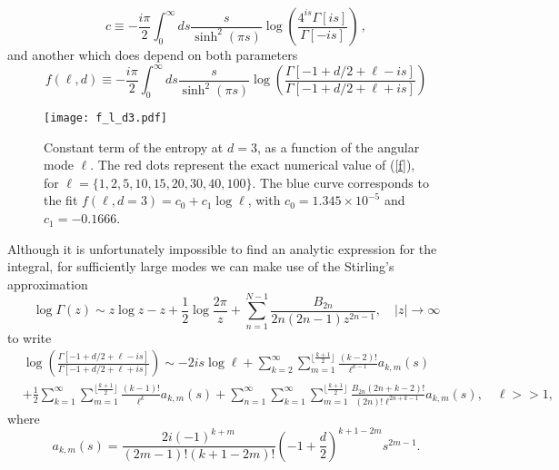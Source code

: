 \documentclass[12pt,a4paper]{article}
\begin{document}
\begin{equation}
c\equiv-\frac{i \pi}{2}\int_0^{\infty} ds \frac{s}{\sinh^2(\pi s)}\log{\left(\frac{4^{ i s}\Gamma\left[i s\right]}{\Gamma\left[-i s\right]}\right)}\, ,
\end{equation}
and another which does depend on both parameters
\begin{equation}\label{f}
f(\ell,d)\equiv-\frac{i \pi}{2}\int_0^{\infty} ds \frac{s}{\sinh^2(\pi s)}\log{\left(\frac{\Gamma\left[-1+d/2+\ell-i s\right]}{\Gamma\left[-1+d/2+\ell+i s\right]}\right)}
\end{equation}
\begin{figure}[t]
\begin{center}  
\texttt{[image: f\_l\_d3.pdf]}
\caption{Constant term of the entropy at $d=3$, as a function of the angular mode $\ell$. The red dots represent the exact numerical value of (\ref{f}), for $\ell=\lbrace 1, 2,5, 10, 15, 20, 30, 40, 100 \rbrace$. The blue curve corresponds to the fit $f(\ell,d=3)=c_0+ c_1\log{\ell}$, with $c_0=1.345\times 10^{-5}$ and $c_1=-0.1666$.}
\label{f_l_d3}
\end{center}  
\end{figure}
Although it is unfortunately impossible to find an analytic expression for the integral, for sufficiently large modes we can make use of the Stirling's approximation
\begin{equation}
\log{\Gamma(z)}\sim z \log{z}-z+\frac{1}{2}\log{\frac{2\pi}{z}}+\sum_{n=1}^{N-1}\frac{B_{2 n}}{2 n(2 n-1) z^{2 n-1}}, \quad \vert z\vert\rightarrow \infty
\end{equation}
to write 
\begin{equation}
\begin{split}
&\log{\left(\frac{\Gamma\left[-1+d/2+\ell-i s\right]}{\Gamma\left[-1+d/2+\ell+i s\right]}\right)}\sim -2 i s \log{\ell}+ \sum_{k=2}^{\infty} \sum_{m=1}^{\lfloor \frac{k+1}{2}\rfloor}\frac{(k-2)!}{\ell^{k-1}} a_{k,m}(s)\\
& +\frac{1}{2}\sum_{k=1}^{\infty} \sum_{m=1}^{\lfloor \frac{k+1}{2}\rfloor}\frac{(k-1)!}{\ell^{k}} a_{k,m}(s)+\sum_{n=1}^{\infty}\sum_{k=1}^{\infty} \sum_{m=1}^{\lfloor \frac{k+1}{2}\rfloor}\frac{B_{2 n} (2 n+k-2)!}{(2 n)!\ell^{2n+k-1}} a_{k,m}(s), \quad \ell>>1,
\end{split}
\end{equation}
where 
\begin{equation}
a_{k,m}(s)=  \frac{2 i(-1)^{k+m}}{(2m-1)! (k+1-2m)!}\left(-1+\frac{d}{2}\right)^{k+1-2 m}s^{2 m-1}.
\end{equation}
\end{document}
